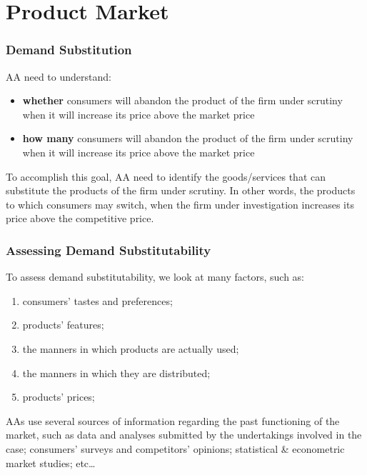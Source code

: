\section{Product Market}

        \subsubsection{Demand Substitution}

            AA need to understand:
            \begin{itemize}
                \item \textbf{whether} consumers will abandon the product of the firm under scrutiny when it will increase its price above the market price
                \item \textbf{how many} consumers will abandon the product of the firm under scrutiny when it will increase its price above the market price
            \end{itemize}

            To accomplish this goal, AA need to identify the goods/services that can substitute the products of the firm under scrutiny. In other words, the products to which consumers may switch, when the firm under investigation increases its price above the competitive price.

        \subsubsection{Assessing Demand Substitutability}

            \noindent
            To assess demand substitutability, we look at many factors, such as:
            \begin{enumerate}
                \item consumers’ tastes and preferences;
                \item products' features;
                \item the manners in which products are actually used;
                \item the manners in which they are distributed;
                \item products’ prices;
            \end{enumerate}

            AAs use several sources of information regarding the past functioning of the market, such as data and analyses submitted by the undertakings involved in the case; consumers’ surveys and competitors’ opinions; statistical \& econometric market studies; etc…

